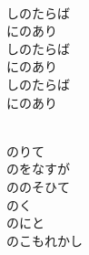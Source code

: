 \documentclass[10pt,b5j]{tarticle} %
\begin{document}
\begin{enumerate}
\begin{minipage}[c]{\blocksize}
    \end{minipage}
    \begin{minipage}[c]{\blocksize}
        
        \vspace{\linespace}
        \item~\\
        しのたらば\\
        にのあり\\
        しのたらば\\
        にのあり\\
        しのたらば\\
        にのあり
        
    \end{minipage}
    \begin{minipage}[c]{\blocksize}
        
        \vspace{\linespace}
        \item~\\
        のりて\\
        のをなすが\\
        ののそひて\\
        のく\\
        のにと\\
        のこもれかし
    
    \end{minipage}
\end{enumerate} %
\end{document}

